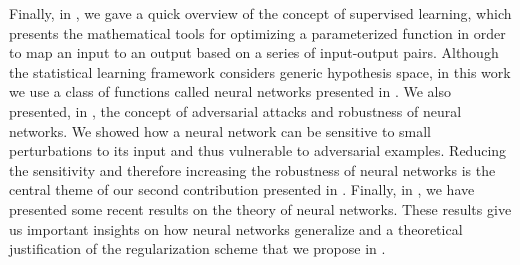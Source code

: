 Finally, in , we gave a quick overview of the concept of supervised learning, which presents the mathematical tools for optimizing a parameterized function in order to map an input to an output based on a series of input-output pairs.
Although the statistical learning framework considers generic hypothesis space, in this work we use a class of functions called neural networks presented in .
We also presented, in , the concept of adversarial attacks and robustness of neural networks.
We showed how a neural network can be sensitive to small perturbations to its input and thus vulnerable to adversarial examples.
Reducing the sensitivity and therefore increasing the robustness of neural networks is the central theme of our second contribution presented in .
Finally, in , we have presented some recent results on the theory of neural networks.
These results give us important insights on how neural networks generalize and a theoretical justification of the regularization scheme that we propose in .





